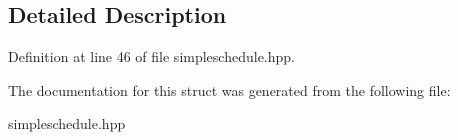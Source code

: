 \subsection{Detailed Description}


Definition at line 46 of file simpleschedule.\+hpp.



The documentation for this struct was generated from the following file\+:\begin{DoxyCompactItemize}
\item 
simpleschedule.\+hpp\end{DoxyCompactItemize}
